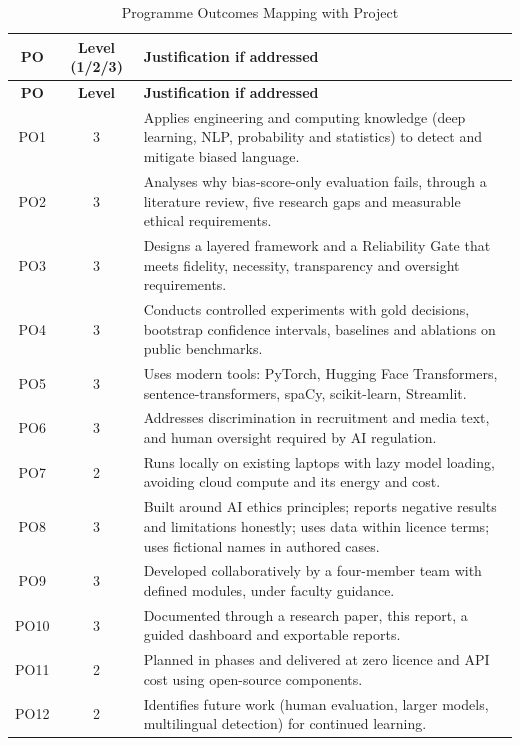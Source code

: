 \documentclass[12pt,a4paper,oneside]{report}
\begin{document}
\begin{longtable}{|c|c|L{11cm}|}
\caption{Programme Outcomes Mapping with Project}\\
\hline
\textbf{PO} & \textbf{Level (1/2/3)} & \textbf{Justification if addressed}\\ \hline\endfirsthead
\hline \textbf{PO} & \textbf{Level} & \textbf{Justification if addressed}\\ \hline\endhead
PO1 & 3 & Applies engineering and computing knowledge (deep learning, NLP, probability and statistics) to detect and
mitigate biased language.\\ \hline
PO2 & 3 & Analyses why bias-score-only evaluation fails, through a literature review, five research gaps and
measurable ethical requirements.\\ \hline
PO3 & 3 & Designs a layered framework and a Reliability Gate that meets fidelity, necessity, transparency and oversight
requirements.\\ \hline
PO4 & 3 & Conducts controlled experiments with gold decisions, bootstrap confidence intervals, baselines and ablations
on public benchmarks.\\ \hline
PO5 & 3 & Uses modern tools: PyTorch, Hugging Face Transformers, sentence-transformers, spaCy, scikit-learn,
Streamlit.\\ \hline
PO6 & 3 & Addresses discrimination in recruitment and media text, and human oversight required by AI regulation.\\ \hline
PO7 & 2 & Runs locally on existing laptops with lazy model loading, avoiding cloud compute and its energy and cost.\\ \hline
PO8 & 3 & Built around AI ethics principles; reports negative results and limitations honestly; uses data within
licence terms; uses fictional names in authored cases.\\ \hline
PO9 & 3 & Developed collaboratively by a four-member team with defined modules, under faculty guidance.\\ \hline
PO10 & 3 & Documented through a research paper, this report, a guided dashboard and exportable reports.\\ \hline
PO11 & 2 & Planned in phases and delivered at zero licence and API cost using open-source components.\\ \hline
PO12 & 2 & Identifies future work (human evaluation, larger models, multilingual detection) for continued learning.\\ \hline
\end{longtable}
\end{document}
